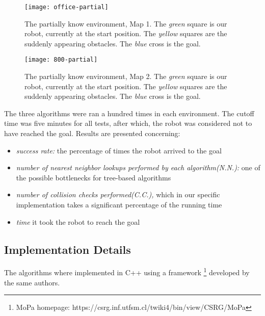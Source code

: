 \documentclass[10pt, conference, compsoc]{IEEEtran}
\begin{document}
\begin{figure}[ht]
\begin{center}
\texttt{[image: office-partial]}
\caption{The partially know environment, Map 1. The \emph{green} square is our robot,
currently at the start position. The \emph{yellow} squares are the suddenly 
appearing obstacles. The \emph{blue} cross is the goal.}
\label{fig:office-partial}
\end{center}
\end{figure}

\begin{figure}[ht]
\begin{center}
\texttt{[image: 800-partial]}
\caption{The partially know environment, Map 2. The \emph{green} square is our robot,
currently at the start position. The \emph{yellow} squares are the suddenly 
appearing obstacles. The \emph{blue} cross is the goal.}
\label{fig:800-partial}
\end{center}
\end{figure}


The three algorithms were ran a hundred times in each
environment.
The cutoff time was five minutes for all tests, after which, the robot was
considered not to have reached the goal. Results are presented concerning:
\begin{itemize}
\item {\it success rate:} the percentage of times the robot arrived to the goal
\item {\it number of nearest neighbor lookups performed by each algorithm(N.N.):} one of the
possible bottlenecks for tree-based algorithms
\item {\it number of collision checks performed(C.C.),} which in our specific
implementation takes a significant percentage of
the running time
\item {\it time} it took the robot to reach the goal
\end{itemize}


\subsection{Implementation Details}

The algorithms where implemented in C++ using a framework
\footnote{MoPa homepage: https://csrg.inf.utfsm.cl/twiki4/bin/view/CSRG/MoPa}
 developed by the same authors.\\
\end{document}
